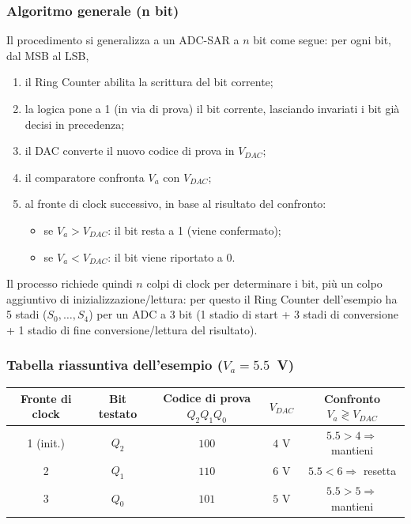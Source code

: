 \documentclass[11pt,a4paper]{report}
\begin{document}
\bigskip
\subsubsection{Algoritmo generale (n bit)}

Il procedimento si generalizza a un ADC-SAR a $n$ bit come segue: per ogni bit, dal MSB al LSB,

\begin{enumerate}
    \item il Ring Counter abilita la scrittura del bit corrente;
    \item la logica pone a 1 (in via di prova) il bit corrente, lasciando invariati i bit gi\`a decisi in precedenza;
    \item il DAC converte il nuovo codice di prova in $V_{DAC}$;
    \item il comparatore confronta $V_a$ con $V_{DAC}$;
    \item al fronte di clock successivo, in base al risultato del confronto:
    \begin{itemize}
        \item se $V_a > V_{DAC}$: il bit resta a 1 (viene confermato);
        \item se $V_a < V_{DAC}$: il bit viene riportato a 0.
    \end{itemize}
\end{enumerate}

Il processo richiede quindi $n$ colpi di clock per determinare i bit, pi\`u un colpo aggiuntivo di inizializzazione/lettura: per questo il Ring Counter dell'esempio ha 5 stadi ($S_0,\dots,S_4$) per un ADC a 3 bit (1 stadio di start + 3 stadi di conversione + 1 stadio di fine conversione/lettura del risultato).

\bigskip
\subsubsection{Tabella riassuntiva dell'esempio ($V_a = 5.5$~V)}

\begin{center}
\begin{tabular}{c c c c c}
\hline
\textbf{Fronte di clock} & \textbf{Bit testato} & \textbf{Codice di prova} $Q_2Q_1Q_0$ & $V_{DAC}$ & \textbf{Confronto} $V_a \gtrless V_{DAC}$ \\
\hline
1 (init.) & $Q_2$ & $100$ & $4$ V & $5.5 > 4 \Rightarrow$ mantieni \\
2          & $Q_1$ & $110$ & $6$ V & $5.5 < 6 \Rightarrow$ resetta \\
3          & $Q_0$ & $101$ & $5$ V & $5.5 > 5 \Rightarrow$ mantieni \\
\hline
\end{tabular}
\end{center}
\end{document}
